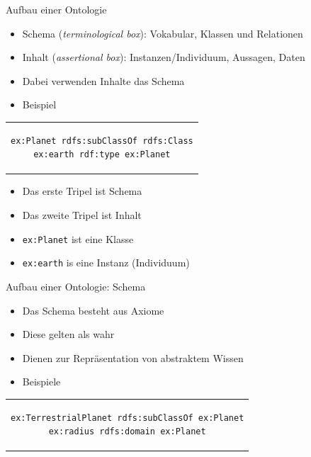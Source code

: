 \documentclass{beamer}
\begin{document}
\begin{frame}[fragile]{Aufbau einer Ontologie}

	\begin{itemize}
		\item Schema (\emph{terminological box}): Vokabular, Klassen und Relationen
		\item Inhalt (\emph{assertional box}): Instanzen/Individuum, Aussagen, Daten 
		\item Dabei verwenden Inhalte das Schema
		\item Beispiel
	\end{itemize}	
	
    \begin{center}
    	\begin{tabular}{c}
    		\begin{lstlisting}
ex:Planet rdfs:subClassOf rdfs:Class
ex:earth rdf:type ex:Planet
    		\end{lstlisting}
    	\end{tabular}
    \end{center}
    
	\begin{itemize}
		\item Das erste Tripel ist Schema
		\item Das zweite Tripel ist Inhalt
		\item \texttt{ex:Planet} ist eine Klasse
		\item \texttt{ex:earth} is eine Instanz (Individuum)
	\end{itemize}	
	
\end{frame}

\begin{frame}[fragile]{Aufbau einer Ontologie: Schema}
	
	\begin{itemize}
		\item Das Schema besteht aus Axiome
		\item Diese gelten als wahr
		\item Dienen zur Repräsentation von abstraktem Wissen
		\item Beispiele
	\end{itemize}	
	
	\begin{center}
		\begin{tabular}{c}
			\begin{lstlisting}
ex:TerrestrialPlanet rdfs:subClassOf ex:Planet
ex:radius rdfs:domain ex:Planet
			\end{lstlisting}
		\end{tabular}
	\end{center}	
	
\end{frame}
\end{document}

